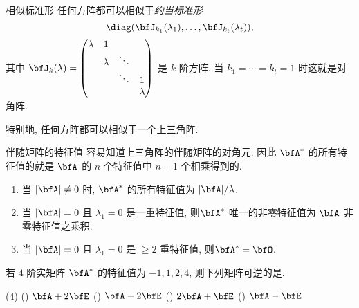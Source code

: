 \begin{frame}{相似标准形\noexer}
	\onslide<+->
	任何方阵都可以相似于\emph{约当标准形}
	\[\diag(\bfJ_{k_1}(\lambda_1),\dots,\bfJ_{k_t}(\lambda_t)),\]
	其中 $\bfJ_k(\lambda)=\begin{pmatrix}
		\lambda&1&&\\
		&\lambda&\ddots&\\
		&&\ddots&1\\
		&&&\lambda
	\end{pmatrix}$ 是 $k$ 阶方阵.
	\onslide<+->
	当 $k_1=\cdots=k_t=1$ 时这就是对角阵.
	
	\onslide<+->
	特别地, 任何方阵都可以相似于一个上三角阵.
\end{frame}


\begin{frame}{伴随矩阵的特征值}
	\onslide<+->
	容易知道上三角阵的伴随矩阵的对角元.
	\onslide<+->
	因此 \alert{$\bfA^*$ 的所有特征值的就是 $\bfA$ 的 $n$ 个特征值中 $n-1$ 个相乘得到的}.
	\begin{enumerate}
		\item 当 $|\bfA|\neq0$ 时, $\bfA^*$ 的所有特征值为 $|\bfA|/\lambda$.
		\item 当 $|\bfA|=0$ 且 $\lambda_1=0$ 是一重特征值, 则$\bfA^*$ 唯一的非零特征值为 $\bfA$ 非零特征值之乘积.
		\item 当 $|\bfA|=0$ 且 $\lambda_1=0$ 是 $\ge2$ 重特征值, 则$\bfA^*=\bfO$.
	\end{enumerate}
	\onslide<+->
	\begin{exercise}
		若 $4$ 阶实矩阵 $\bfA^*$ 的特征值为 $-1,1,2,4$, 则下列矩阵可逆的是.
		\begin{exchoice}(4)
			() $\bfA+2\bfE$
			() $\bfA-2\bfE$
			() $2\bfA+\bfE$
			() $\bfA-\bfE$
		\end{exchoice}
	\end{exercise}
\end{frame}



